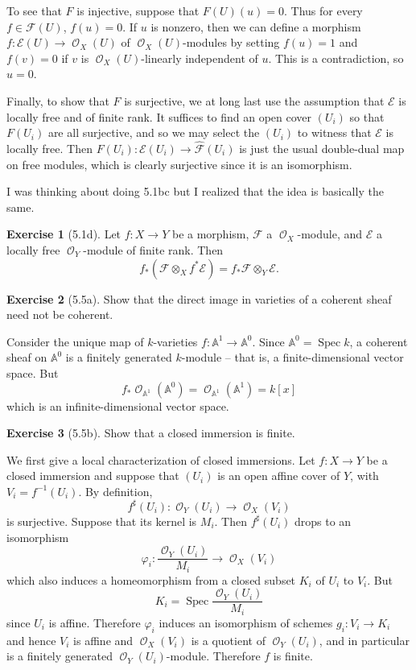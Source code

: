 \documentclass[10pt]{article}
\newcommand{\Aff}{\mathbb A}
\newcommand{\Spec}{\operatorname{Spec}}
\DeclareMathOperator{\Olo}{\mathscr O}
\theoremstyle{definition}
\newtheorem{exer}{Exercise}
\begin{document}
To see that $F$ is injective, suppose that $F(U)(u) = 0$.
Thus for every $f \in \mathscr F(U)$, $f(u) = 0$.
If $u$ is nonzero, then we can define a morphism $f: \mathscr E(U) \to \Olo_X(U)$ of $\Olo_X(U)$-modules by setting $f(u) = 1$ and $f(v) = 0$ if $v$ is $\Olo_X(U)$-linearly independent of $u$.
This is a contradiction, so $u = 0$.

Finally, to show that $F$ is surjective, we at long last use the assumption that $\mathscr E$ is locally free and of finite rank.
It suffices to find an open cover $(U_i)$ so that $F(U_i)$ are all surjective, and so we may select the $(U_i)$ to witness that $\mathscr E$ is locally free.
Then $F(U_i): \mathscr E(U_i) \to \widehat{\mathscr F}(U_i)$ is just the usual double-dual map on free modules, which is clearly surjective since it is an isomorphism.

I was thinking about doing 5.1bc but I realized that the idea is basically the same.

\begin{exer}[5.1d]
Let $f: X \to Y$ be a morphism, $\mathscr F$ a $\Olo_X$-module, and $\mathscr E$ a locally free $\Olo_Y$-module of finite rank.
Then
$$f_*(\mathscr F \otimes_X f^* \mathscr E) = f_* \mathscr F \otimes_Y \mathscr E.$$
\end{exer}

\begin{exer}[5.5a]
Show that the direct image in varieties of a coherent sheaf need not be coherent.
\end{exer}

Consider the unique map of $k$-varieties $f: \Aff^1 \to \Aff^0$.
Since $\Aff^0 = \Spec k$, a coherent sheaf on $\Aff^0$ is a finitely generated $k$-module -- that is, a finite-dimensional vector space.
But
$$f_* \Olo_{\Aff^1}(\Aff^0) = \Olo_{\Aff^1}(\Aff^1) = k[x]$$
which is an infinite-dimensional vector space.

\begin{exer}[5.5b]
Show that a closed immersion is finite.
\end{exer}

We first give a local characterization of closed immersions.
Let $f: X \to Y$ be a closed immersion and suppose that $(U_i)$ is an open affine cover of $Y$, with $V_i = f^{-1}(U_i)$.
By definition,
$$f^\sharp(U_i): \Olo_Y(U_i) \to \Olo_X(V_i)$$
is surjective. Suppose that its kernel is $M_i$. Then $f^\sharp(U_i)$ drops to an isomorphism
$$\varphi_i: \frac{\Olo_Y(U_i)}{M_i} \to \Olo_X(V_i)$$
which also induces a homeomorphism from a closed subset $K_i$ of $U_i$ to $V_i$.
But
$$K_i = \Spec \frac{\Olo_Y(U_i)}{M_i}$$
since $U_i$ is affine.
Therefore $\varphi_i$ induces an isomorphism of schemes $g_i: V_i \to K_i$ and hence $V_i$ is affine and $\Olo_X(V_i)$ is a quotient of $\Olo_Y(U_i)$, and in particular is a finitely generated $\Olo_Y(U_i)$-module.
Therefore $f$ is finite.
\end{document}
